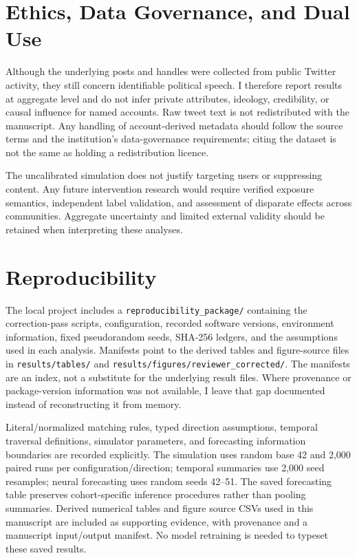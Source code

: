 \documentclass[11pt,a4paper]{article}
\begin{document}
\section{Ethics, Data Governance, and Dual Use}
Although the underlying posts and handles were collected from public Twitter activity, they still concern identifiable political speech. I therefore report results at aggregate level and do not infer private attributes, ideology, credibility, or causal influence for named accounts. Raw tweet text is not redistributed with the manuscript. Any handling of account-derived metadata should follow the source terms and the institution's data-governance requirements; citing the dataset is not the same as holding a redistribution licence.

The uncalibrated simulation does not justify targeting users or suppressing content. Any future intervention research would require verified exposure semantics, independent label validation, and assessment of disparate effects across communities. Aggregate uncertainty and limited external validity should be retained when interpreting these analyses.

\section{Reproducibility}
The local project includes a \texttt{reproducibility\_package/} containing the correction-pass scripts, configuration, recorded software versions, environment information, fixed pseudorandom seeds, SHA-256 ledgers, and the assumptions used in each analysis. Manifests point to the derived tables and figure-source files in \texttt{results/tables/} and \texttt{results/figures/reviewer\_corrected/}. The manifests are an index, not a substitute for the underlying result files. Where provenance or package-version information was not available, I leave that gap documented instead of reconstructing it from memory.

Literal/normalized matching rules, typed direction assumptions, temporal traversal definitions, simulator parameters, and forecasting information boundaries are recorded explicitly. The simulation uses random base 42 and 2,000 paired runs per configuration/direction; temporal summaries use 2,000 seed resamples; neural forecasting uses random seeds 42--51. The saved forecasting table preserves cohort-specific inference procedures rather than pooling summaries. Derived numerical tables and figure source CSVs used in this manuscript are included as supporting evidence, with provenance and a manuscript input/output manifest. No model retraining is needed to typeset these saved results.
\end{document}

